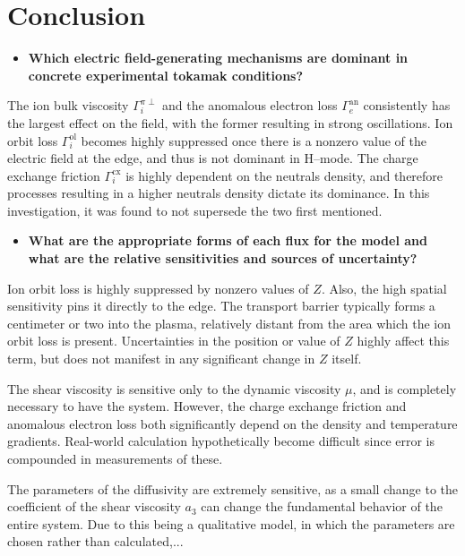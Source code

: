 \chapter{Conclusion}\label{chapter:conclusion}

\begin{itemize}
	\item \textbf{Which electric field-generating mechanisms are dominant in concrete experimental tokamak conditions?}
\end{itemize}

The ion bulk viscosity $\Gamma_i^{\pi\perp}$ and the anomalous electron loss $\Gamma_e^\text{an}$ consistently has the largest effect on the field, with the former resulting in strong oscillations.
Ion orbit loss $\Gamma_i^\text{ol}$ becomes highly suppressed once there is a nonzero value of the electric field at the edge, and thus is not dominant in H--mode.
The charge exchange friction $\Gamma_i^\text{cx}$ is highly dependent on the neutrals density, and therefore processes resulting in a higher neutrals density dictate its dominance.
In this investigation, it was found to not supersede the two first mentioned.


\begin{itemize}
	\item \textbf{What are the appropriate forms of each flux for the model and what are the relative sensitivities and sources of uncertainty?}
\end{itemize}

Ion orbit loss is highly suppressed by nonzero values of $Z$.
Also, the high spatial sensitivity pins it directly to the edge.
The transport barrier typically forms a centimeter or two into the plasma, relatively distant from the area which the ion orbit loss is present.
Uncertainties in the position or value of $Z$ highly affect this term, but does not manifest in any significant change in $Z$ itself.

The shear viscosity is sensitive only to the dynamic viscosity $\mu$, and is completely necessary to have the system.
However, the charge exchange friction and anomalous electron loss both significantly depend on the density and temperature gradients.
Real-world calculation hypothetically become difficult since error is compounded in measurements of these.

The parameters of the diffusivity are extremely sensitive, as a small change to the coefficient of the shear viscosity $a_3$ can change the fundamental behavior of the entire system.
Due to this being a qualitative model, in which the parameters are chosen rather than calculated,...


